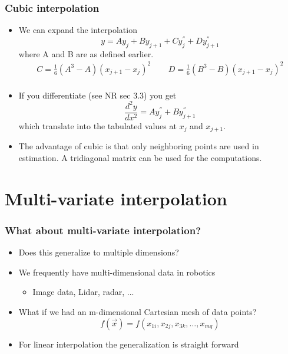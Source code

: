 \documentclass[10pt]{beamer}
\begin{document}
\begin{frame}
  \frametitle{Cubic interpolation}
  \begin{itemize}
  \item We can expand the interpolation
    \[
      y = A y_j + B y_{j+1} + C y^{''}_j + D y^{''}_{j+1}
    \]
    where A and B are as defined earlier.
    \[
      \begin{array}{cc}
        C = \frac{1}{6} (A^3-A)(x_{j+1} - x_j)^2 ~~~ & ~~~
        D = \frac{1}{6} (B^3-B)(x_{j+1} - x_j)^2\\                                                       
      \end{array}
    \]
  \item If you differentiate (see NR sec 3.3) you get
    \[
      \frac{d^2y}{dx^2} = A y^{''}_j + B y^{''}_{j+1}
    \]
    which translate into the tabulated values at $x_j$ and $x_{j+1}$.
  \item The advantage of cubic is that only neighboring points are
    used in estimation. A tridiagonal matrix can be used for the
    computations. 
  \end{itemize}
\end{frame}

\section{Multi-variate interpolation}

\begin{frame}
  \frametitle{What about multi-variate interpolation? }
  \begin{itemize}
  \item Does this generalize to multiple dimensions? 
  \item We frequently have multi-dimensional data in robotics
    \begin{itemize}
    \item Image data, Lidar, radar, ...
    \end{itemize}
  \item What if we had an m-dimensional Cartesian mesh of data points?
    \[
      f(\vec{x}) = f(x_{1i}, x_{2j}, x_{3k}, \ldots, x_{mq})
    \]
  \item For linear interpolation the generalization is straight forward
  \end{itemize}
\end{frame}
\end{document}
